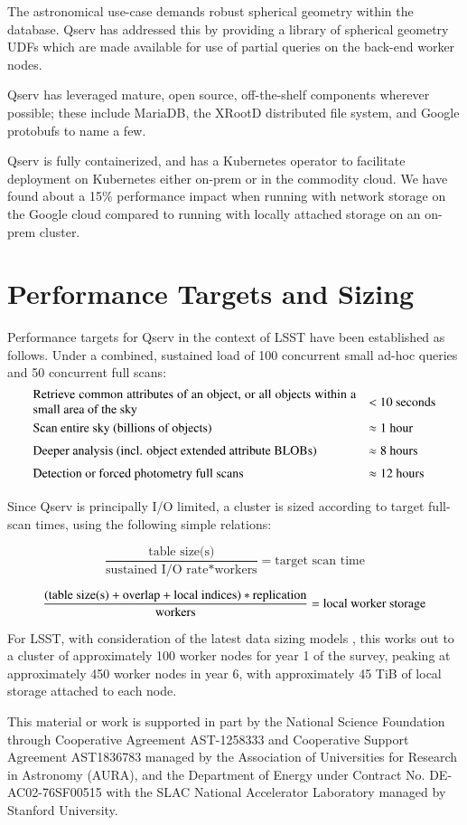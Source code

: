 \documentclass[11pt,twoside]{article}
\begin{document}
The astronomical use-case demands robust spherical geometry within the database.  Qserv has addressed
this by providing a library of spherical geometry UDFs which are made available for use of partial queries on
the back-end worker nodes.

Qserv has leveraged mature, open source, off-the-shelf components wherever possible; these include MariaDB,
the XRootD distributed file system, and Google protobufs to name a few.

Qserv is fully containerized, and has a Kubernetes operator to facilitate deployment on Kubernetes either
on-prem or in the commodity cloud.  We have found about a 15\% performance impact when running with network
storage on the Google cloud compared to running with locally attached storage on an on-prem cluster.

\section{Performance Targets and Sizing}

Performance targets for Qserv in the context of LSST have been established as follows.  Under a combined,
sustained load of 100 concurrent small ad-hoc queries and 50 concurrent full scans:
\[
{\renewcommand{\arraystretch}{1.5}\begin{array}{ll}
  \parbox{9cm}{Retrieve common attributes of an object, or all objects within a small area of the sky}
    & \mbox{< 10 seconds} \\
  \mbox{Scan entire sky (billions of objects)}
    & \mbox{$\approx{}$1 hour} \\
  \mbox{Deeper analysis (incl. object extended attribute BLOBs)}
    & \mbox{$\approx{}$8 hours} \\
  \mbox{Detection or forced photometry full scans}
    & \mbox{$\approx{}$12 hours} \\
\end{array}}
\]

Since Qserv is principally I/O limited, a cluster is sized according to target full-scan times, using the
following simple relations:

\[
    \frac{\text{table size(s)}}{\text{sustained I/O rate} * \text{workers}} = \text{target scan time}
\]

\[
    \frac{(\text{table size(s)} + \text{overlap} + \text{local indices}) * \text{replication}}
    {\text{workers}} = \text{local worker storage} \\
\]

For LSST, with consideration of the latest data sizing models \citep{DMTN-135}, this works out to a cluster of
approximately 100 worker nodes for year 1 of the survey, peaking at approximately 450 worker nodes in year 6,
with approximately 45 TiB of local storage attached to each node.

\acknowledgements This material or work is supported in part by the National Science Foundation through
Cooperative Agreement AST-1258333 and Cooperative Support Agreement AST1836783 managed by the Association of
Universities for Research in Astronomy (AURA), and the Department of Energy under Contract No.
DE-AC02-76SF00515 with the SLAC National Accelerator Laboratory managed by Stanford University.


\end{document}
